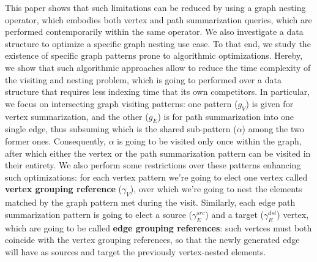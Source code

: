 This paper shows that such limitations can be reduced by using a graph nesting operator, which embodies both vertex and path summarization queries, which are performed contemporarily within the same operator. %
We also investigate a data structure to optimize a specific graph nesting use case. To that end, we study the existence of specific graph patterns prone to algorithmic optimizations. Hereby, we show that such algorithmic approaches allow to reduce the time complexity of the visiting and nesting problem, which is going to performed over a data structure that requires less indexing time that its own competitors. In particular, we focus on intersecting graph visiting patterns: one pattern ($g_V$) is given for vertex summarization, and the other ($g_E$) is for path summarization into one single edge, thus subsuming which is the shared sub-pattern ($\alpha$) among the two former ones. Consequently, $\alpha$ is going to be visited only once within the graph, after which either the vertex or the path summarization pattern can be visited in their entirety. We also perform some restrictions over these patterns enhancing such optimizations: for each vertex pattern we're going to elect one vertex called \textbf{vertex grouping reference} ($\gamma_V$), over which we're going to nest the elements matched by the graph pattern met during the visit. Similarly, each edge path summarization pattern is going to elect a source ($\gamma_E^{src}$) and a target ($\gamma_E^{dst}$) vertex, which are going to be called \textbf{edge grouping references}: such vertces must both coincide with the vertex grouping references, so that the newly generated edge will have as sources and target the previously vertex-nested elements. 

